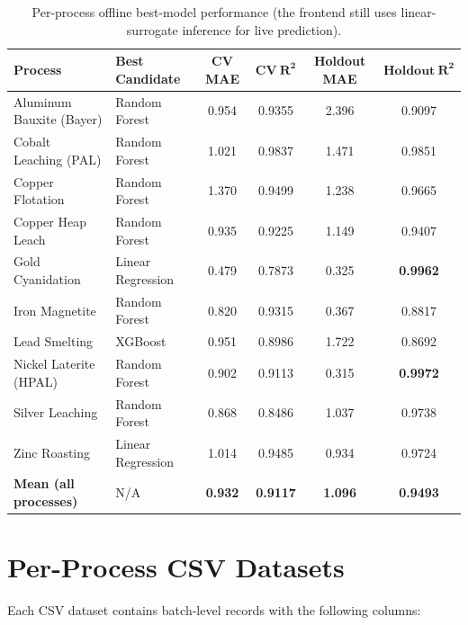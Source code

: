 \documentclass[12pt,a4paper]{report}
\begin{document}
\begin{table}[H]
\centering
\caption{Per-process offline best-model performance (the frontend still uses linear-surrogate inference for live prediction).}
\label{tab:model_results}
\footnotesize
\begin{tabular}{@{} l l c c c c @{}}
\toprule
\textbf{Process} & \textbf{Best Candidate} & \textbf{CV MAE} & $\boldsymbol{CV\ R^2}$ & \textbf{Holdout MAE} & $\boldsymbol{Holdout\ R^2}$ \\
\midrule
Aluminum Bauxite (Bayer)  & Random Forest    & 0.954 & 0.9355 & 2.396 & 0.9097 \\
Cobalt Leaching (PAL)     & Random Forest    & 1.021 & 0.9837 & 1.471 & 0.9851 \\
Copper Flotation          & Random Forest    & 1.370 & 0.9499 & 1.238 & 0.9665 \\
Copper Heap Leach         & Random Forest    & 0.935 & 0.9225 & 1.149 & 0.9407 \\
Gold Cyanidation          & Linear Regression & 0.479 & 0.7873 & 0.325 & \textbf{0.9962} \\
Iron Magnetite            & Random Forest    & 0.820 & 0.9315 & 0.367 & 0.8817 \\
Lead Smelting             & XGBoost          & 0.951 & 0.8986 & 1.722 & 0.8692 \\
Nickel Laterite (HPAL)    & Random Forest    & 0.902 & 0.9113 & 0.315 & \textbf{0.9972} \\
Silver Leaching           & Random Forest    & 0.868 & 0.8486 & 1.037 & 0.9738 \\
Zinc Roasting             & Linear Regression & 1.014 & 0.9485 & 0.934 & 0.9724 \\
\midrule
\textbf{Mean (all processes)} & N/A & \textbf{0.932} & \textbf{0.9117} & \textbf{1.096} & \textbf{0.9493} \\
\bottomrule
\end{tabular}
\end{table}

\section{Per-Process CSV Datasets}

Each CSV dataset contains batch-level records with the following columns:
\end{document}
